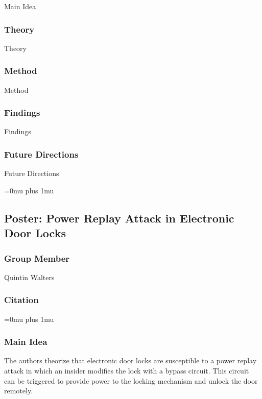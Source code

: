 \noindent
Main Idea

\subsubsection{Theory}

\noindent
Theory

\subsubsection{Method}

\noindent
Method

\subsubsection{Findings}

\noindent
Findings

\subsubsection{Future Directions}

\noindent
Future Directions 

\Urlmuskip=0mu plus 1mu\relax

\noindent
\subsection{Poster: Power Replay Attack in Electronic Door Locks}

\subsubsection{Group Member}

\noindent
Quintin Walters

\noindent
\subsubsection{Citation}

\Urlmuskip=0mu plus 1mu\relax

\subsubsection{Main Idea}

\noindent
The authors theorize that electronic door locks are susceptible to a power replay attack in which an insider modifies the lock with a bypass circuit.  This circuit can be triggered to provide power to the locking mechanism and unlock the door remotely.

